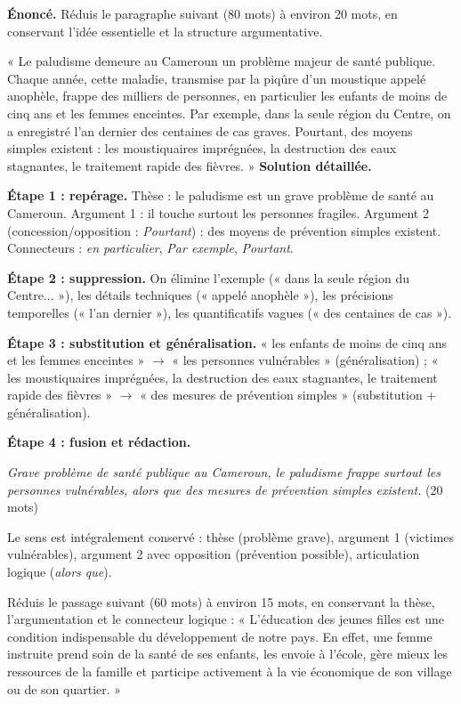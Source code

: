 \documentclass[11pt]{article}
\begin{document}
\begin{exoresolu}
\textbf{Énoncé.} Réduis le paragraphe suivant (80 mots) à environ 20 mots, en conservant l'idée essentielle et la structure argumentative.

« Le paludisme demeure au Cameroun un problème majeur de santé publique. Chaque année, cette maladie, transmise par la piqûre d'un moustique appelé anophèle, frappe des milliers de personnes, en particulier les enfants de moins de cinq ans et les femmes enceintes. Par exemple, dans la seule région du Centre, on a enregistré l'an dernier des centaines de cas graves. Pourtant, des moyens simples existent : les moustiquaires imprégnées, la destruction des eaux stagnantes, le traitement rapide des fièvres. »
\tcblower
\textbf{Solution détaillée.}

\textbf{Étape 1 : repérage.} Thèse : le paludisme est un grave problème de santé au Cameroun. Argument 1 : il touche surtout les personnes fragiles. Argument 2 (concession/opposition : \emph{Pourtant}) : des moyens de prévention simples existent. Connecteurs : \emph{en particulier}, \emph{Par exemple}, \emph{Pourtant}.

\textbf{Étape 2 : suppression.} On élimine l'exemple (« dans la seule région du Centre... »), les détails techniques (« appelé anophèle »), les précisions temporelles (« l'an dernier »), les quantificatifs vagues (« des centaines de cas »).

\textbf{Étape 3 : substitution et généralisation.} « les enfants de moins de cinq ans et les femmes enceintes » $\rightarrow$ « les personnes vulnérables » (généralisation) ; « les moustiquaires imprégnées, la destruction des eaux stagnantes, le traitement rapide des fièvres » $\rightarrow$ « des mesures de prévention simples » (substitution + généralisation).

\textbf{Étape 4 : fusion et rédaction.}

\emph{Grave problème de santé publique au Cameroun, le paludisme frappe surtout les personnes vulnérables, alors que des mesures de prévention simples existent.} (20 mots)

Le sens est intégralement conservé : thèse (problème grave), argument 1 (victimes vulnérables), argument 2 avec opposition (prévention possible), articulation logique (\emph{alors que}).
\end{exoresolu}

\begin{exercice}
Réduis le passage suivant (60 mots) à environ 15 mots, en conservant la thèse, l'argumentation et le connecteur logique : « L'éducation des jeunes filles est une condition indispensable du développement de notre pays. En effet, une femme instruite prend soin de la santé de ses enfants, les envoie à l'école, gère mieux les ressources de la famille et participe activement à la vie économique de son village ou de son quartier. »
\end{exercice}
\end{document}
